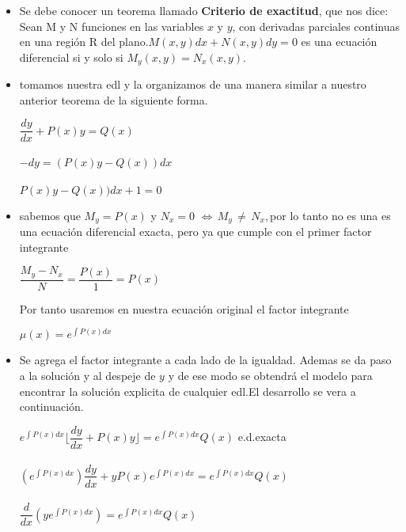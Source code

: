 \documentclass[10pt,a4paper]{article}
\begin{document}
 \begin{itemize}
 \item Se debe conocer un teorema llamado \textbf{Criterio de exactitud}, que nos dice: Sean M y N funciones en las variables $x$ y $y$, con derivadas parciales continuas en una región R del plano.$M(x,y)dx+N(x,y)dy=0$ es una ecuación diferencial si y solo si $M_y(x,y)=N_x(x,y)$.
  \item tomamos nuestra edl y la organizamos de una manera similar a nuestro anterior teorema de la siguiente forma.
 \begin{center}
 $\dfrac{dy}{dx}+P(x)y=Q(x)$\\
 \,\\
 $-dy=(P(x)y-Q(x))dx$\\
  \,\\
 $P(x)y-Q(x))dx+1=0$\\
  \end{center}
  
  \item sabemos que $M_y=P(x)$ y $N_x=0$ $\Leftrightarrow$\,$M_y$\,$\neq$\,$N_x$,\,por lo tanto no es una es una ecuación diferencial exacta, pero ya que cumple con el primer factor integrante\\
  \begin{center}
  $\dfrac{M_y-N_x}{N}=\dfrac{P(x)}{1}=P(x)$
 \end{center}
Por tanto usaremos en nuestra ecuación original el factor integrante
    \begin{center}
  $\mu(x)=e^{\int P(x)dx}$
 \end{center}
 \item Se agrega el factor integrante a cada lado de la igualdad. Ademas se da paso a la solución y al despeje de $y$ y de ese modo se obtendrá el modelo para encontrar la solución explicita de cualquier edl.El desarrollo se vera a continuación.\\
 \begin{center}
 $e^{\int P(x)dx}\lfloor\dfrac{dy}{dx}+P(x)y\rfloor= e^{\int P(x)dx}Q(x)$ e.d.exacta\\
 \,\\
 $(e^{\int P(x)dx})\dfrac{dy}{dx}+yP(x)e^{\int P(x)dx}=e^{\int P(x)dx}Q(x)$\\
 \,\\
 $\dfrac{d}{dx}(ye^{\int P(x)dx})=e^{\int P(x)dx}Q(x)$\\
 
 \vspace{1cm}
 
 \end{center}
 

\end{itemize}
\end{document}
